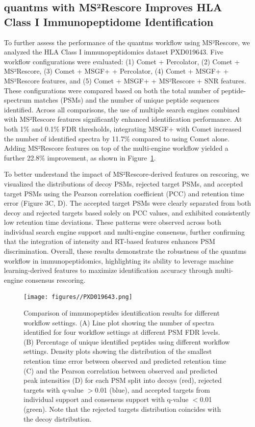 \documentclass[12pt]{article}
\begin{document}
\subsection{quantms with MS²Rescore Improves HLA Class I Immunopeptidome Identification}
To further assess the performance of the quantms workflow using MS²Rescore, we analyzed the HLA Class I immunopeptidomics dataset PXD019643. Five workflow configurations were evaluated: (1) Comet + Percolator, (2) Comet + MS²Rescore, (3) Comet + MSGF+ + Percolator, (4) Comet + MSGF+ + MS²Rescore features, and (5) Comet + MSGF+ + MS²Rescore + SNR features. These configurations were compared based on both the total number of peptide-spectrum matches (PSMs) and the number of unique peptide sequences identified. Across all comparisons, the use of multiple search engines combined with MS²Rescore features significantly enhanced identification performance. At both 1\% and 0.1\% FDR thresholds, integrating MSGF+ with Comet increased the number of identified spectra by 11.7\% compared to using Comet alone. Adding MS²Rescore features on top of the multi-engine workflow yielded a further 22.8\% improvement, as shown in Figure~\ref{fig:PXD019643_immunopeptides}.

To better understand the impact of MS²Rescore-derived features on rescoring, we visualized the distributions of decoy PSMs, rejected target PSMs, and accepted target PSMs using the Pearson correlation coefficient (PCC) and retention time error (Figure 3C, D). The accepted target PSMs were clearly separated from both decoy and rejected targets based solely on PCC values, and exhibited consistently low retention time deviations. These patterns were observed across both individual search engine support and multi-engine consensus, further confirming that the integration of intensity and RT-based features enhances PSM discrimination. Overall, these results demonstrate the robustness of the quantms workflow in immunopeptidomics, highlighting its ability to leverage machine learning-derived features to maximize identification accuracy through multi-engine consensus rescoring.

\begin{figure}[ht!]
	\centering
	\texttt{[image: figures//PXD019643.png]}
	\caption{Comparison of immunopeptides identification results for different workflow settings. (A) Line plot showing the number of spectra identified for four workflow settings at different PSM FDR levels. (B) Percentage of unique identified peptides using different workflow settings. Density plots showing the distribution of the smallest retention time error between observed and predicted retention time (C) and the Pearson correlation between observed and predicted peak intensities (D) for each PSM split into decoys (red), rejected targets with q-value $>$0.01 (blue), and accepted targets from individual support and consensus support with q-value $<$0.01 (green). Note that the rejected targets distribution coincides with the decoy distribution.}
	\label{fig:PXD019643_immunopeptides}
\end{figure}
\end{document}

